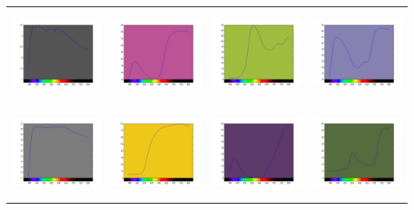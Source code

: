 \documentclass{amsart}
\theoremstyle{definition}
\theoremstyle{remark}
\numberwithin{equation}{section}
\begin{document}
\begin{tabular}{  c c c c }
\includegraphics[width=3.0cm,height=3.0cm]{images/ch5.jpg}
&
\includegraphics[width=3.0cm,height=3.0cm]{images/ch6.jpg}
&
\includegraphics[width=3.0cm,height=3.0cm]{images/ch7.jpg}
&
\includegraphics[width=3.0cm,height=3.0cm]{images/ch8.jpg}
\\

\includegraphics[width=3.0cm,height=3.0cm]{images/ch9.jpg}
&
\includegraphics[width=3.0cm,height=3.0cm]{images/ch10.jpg}
&
\includegraphics[width=3.0cm,height=3.0cm]{images/ch11.jpg}
&
\includegraphics[width=3.0cm,height=3.0cm]{images/ch12.jpg}
\\


\end{tabular}
\end{document}
